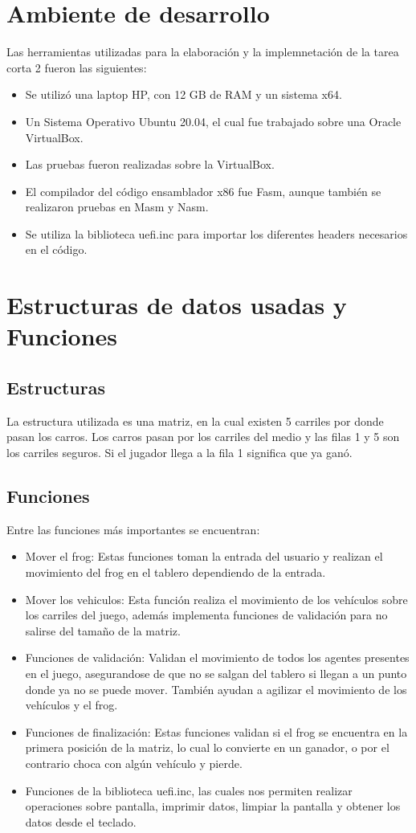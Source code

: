 \documentclass{article}
\begin{document}
\section{Ambiente de desarrollo}

Las herramientas utilizadas para la elaboración y la implemnetación de la tarea corta 2 fueron las siguientes: 

\begin{itemize}
    \item Se utilizó una laptop HP, con 12 GB de RAM y un sistema x64. 
    \item Un Sistema Operativo Ubuntu 20.04, el cual fue trabajado sobre una Oracle VirtualBox. 
    \item Las pruebas fueron realizadas sobre la VirtualBox. 
    \item El compilador del código ensamblador x86 fue Fasm, aunque también se realizaron pruebas en Masm y Nasm. 
    \item Se utiliza la biblioteca uefi.inc para importar los diferentes headers necesarios en el código. 
\end{itemize}

\section{Estructuras de datos usadas y Funciones}
\subsection{Estructuras}
La estructura utilizada es una matriz, en la cual existen 5 carriles por donde pasan los carros. Los carros pasan por los carriles del medio y las filas 1 y 5 son los carriles seguros. Si el jugador llega a la fila 1 significa que ya ganó. 
\subsection{Funciones}
Entre las funciones más importantes se encuentran:
\begin{itemize}
    \item Mover el frog: Estas funciones toman la entrada del usuario y realizan el movimiento del frog en el tablero dependiendo de la entrada. 
    \item Mover los vehiculos: Esta función realiza el movimiento de los vehículos sobre los carriles del juego, además implementa funciones de validación para no salirse del tamaño de la matriz. 
    \item Funciones de validación: Validan el movimiento de todos los agentes presentes en el juego, asegurandose de que no se salgan del tablero si llegan a un punto donde ya no se puede mover. También ayudan a agilizar el movimiento de los vehículos y el frog. 
    \item Funciones de finalización: Estas funciones validan si el frog se encuentra en la primera posición de la matriz, lo cual lo convierte en un ganador, o por el contrario choca con algún vehículo y pierde. 
    \item Funciones de la biblioteca uefi.inc, las cuales nos permiten realizar operaciones sobre pantalla, imprimir datos, limpiar la pantalla y obtener los datos desde el teclado. 
\end{itemize}
\end{document}
